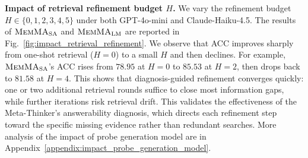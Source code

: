 \noindent\textbf{Impact of retrieval refinement budget $H$.}
We vary the refinement budget $H \in \{0,1,2,3,4,5\}$ under both GPT-4o-mini and Claude-Haiku-4.5.
The results of $\textnormal{\textsc{MemMA}}_{\mathrm{SA}}$ and $\textnormal{\textsc{MemMA}}_{\mathrm{LM}}$ are reported in Fig.~\ref{fig:impact_retrieval_refinement}.
We observe that ACC improves sharply from one-shot retrieval ($H{=}0$) to a small $H$ and then declines.
For example, $\textnormal{\textsc{MemMA}}_{\mathrm{SA}}$'s ACC rises from $78.95$ at $H{=}0$ to $85.53$ at $H{=}2$, then drops back to $81.58$ at $H{=}4$.
This shows that diagnosis-guided refinement converges quickly: one or two additional retrieval rounds suffice to close most information gaps, while further iterations risk retrieval drift. This validates the effectiveness of the Meta-Thinker's answerability diagnosis, which directs each refinement step toward the specific missing evidence rather than redundant searches. More analysis of the impact of probe generation model are in Appendix~\ref{appendix:impact_probe_generation_model}.


